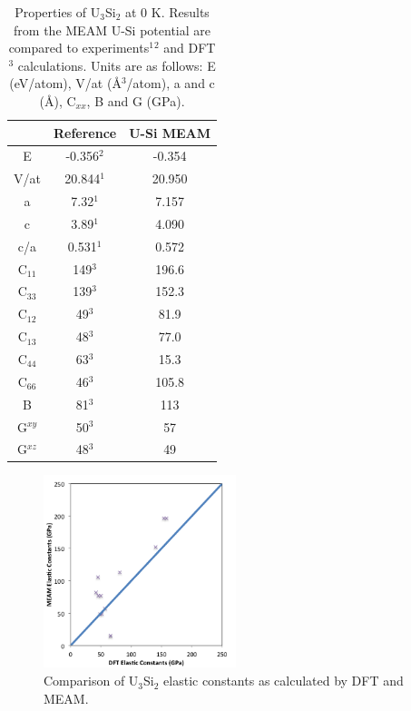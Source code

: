 \documentclass[review]{elsarticle}
\begin{document}
\begin{table}[h!]
\caption{Properties of U$_{3}$Si$_{2}$ at 0 K.  Results from the MEAM U-Si potential are compared to experiments$^{1}$\cite{zachariasen1949}$^{2}$\cite{berche2009} and DFT$^{3}$\cite{noordhoek2016} calculations.  Units are as follows: E (eV/atom), V/at (\AA$^{3}$/atom), a and c (\AA), C$_{xx}$, B and G (GPa). }\label{tab:ben5}
\begin{center}
\begin{tabular}{|c|c|c|}
     \hline
      & Reference & U-Si MEAM  \\
     \hline
     E & -0.356$^{2}$ & -0.354 \\
     V/at & 20.844$^{1}$ & 20.950 \\
     a & 7.32$^{1}$ & 7.157 \\
     c & 3.89$^{1}$ & 4.090 \\
     c/a & 0.531$^{1}$ & 0.572 \\
     C$_{11}$ & 149$^{3}$ & 196.6 \\
     C$_{33}$ & 139$^{3}$ & 152.3 \\
     C$_{12}$ & 49$^{3}$ & 81.9 \\
     C$_{13}$ & 48$^{3}$ & 77.0 \\
     C$_{44}$ & 63$^{3}$ & 15.3 \\
     C$_{66}$ & 46$^{3}$ & 105.8 \\
     B & 81$^{3}$ & 113 \\
     G$^{xy}$ & 50$^{3}$ & 57 \\
     G$^{xz}$ & 48$^{3}$ & 49 \\
     \hline
\end{tabular}
\end{center}
\label{default}
\end{table}%

\begin{figure}[ht]
	\centering
	\includegraphics[width=0.5\textwidth]{elastic_constants.png}
    \caption{Comparison of U$_{3}$Si$_{2}$ elastic constants as calculated by DFT and MEAM.}\label{fig:elastic}
\end{figure}
\end{document}
